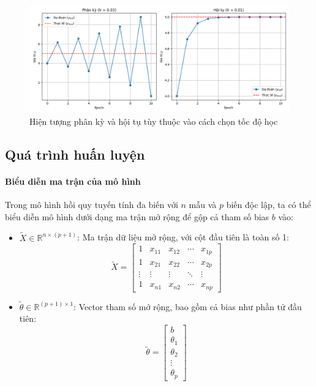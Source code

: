 \begin{figure}[H]
    \centering
    \includegraphics[width=1\linewidth]{img_multiple/diverge_converge.png}
    \caption{Hiện tượng phân kỳ và hội tụ tùy thuộc vào cách chọn tốc độ học}
    \label{fig:diverge_converge}
\end{figure}

\subsection{Quá trình huấn luyện}
\paragraph{Biểu diễn ma trận của mô hình}
Trong mô hình hồi quy tuyến tính đa biến với \( n \) mẫu và \( p \) biến độc lập, ta có thể biểu diễn mô hình dưới dạng ma trận mở rộng để gộp cả tham số bias \( b \) vào:

\begin{itemize}
    \item \( \tilde{X} \in \mathbb{R}^{n \times (p+1)} \): Ma trận dữ liệu mở rộng, với cột đầu tiên là toàn số 1:
    \[
        \tilde{X} = 
        \begin{bmatrix}
            1 & x_{11} & x_{12} & \cdots & x_{1p} \\
            1 & x_{21} & x_{22} & \cdots & x_{2p} \\
            \vdots & \vdots & \vdots & \ddots & \vdots \\
            1 & x_{n1} & x_{n2} & \cdots & x_{np}
        \end{bmatrix}
    \]
    
    \item \( \tilde{\theta} \in \mathbb{R}^{(p+1) \times 1} \): Vector tham số mở rộng, bao gồm cả bias như phần tử đầu tiên:
    \[
        \tilde{\theta} = 
        \begin{bmatrix}
            b \\
            \theta_1 \\
            \theta_2 \\
            \vdots \\
            \theta_p
        \end{bmatrix}
    \]
\end{itemize}

